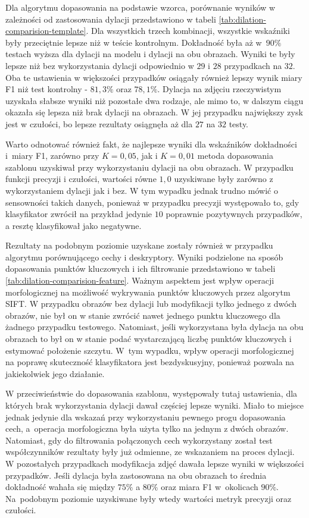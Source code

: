 Dla algorytmu dopasowania na podstawie wzorca, porównanie wyników w zależności od zastosowania dylacji przedstawiono w tabeli \ref{tab:dilation-comparision-template}. Dla wszystkich trzech kombinacji, wszystkie wskaźniki były przeciętnie lepsze niż w teście kontrolnym. Dokładność była aż w~$90\%$ testach wyższa dla dylacji na modelu i dylacji na obu obrazach. Wyniki te były lepsze niż bez wykorzystania dylacji odpowiednio w $29$ i $28$ przypadkach na $32$. Oba te ustawienia w większości przypadków osiągały również lepszy wynik miary F1 niż test kontrolny - $81,3\%$ oraz $78,1\%$. Dylacja na zdjęciu rzeczywistym uzyskała słabsze wyniki niż pozostałe dwa rodzaje, ale mimo to, w dalszym ciągu okazała się lepsza niż brak dylacji na obrazach. W jej przypadku największy zysk jest w czułości, bo lepsze rezultaty osiągnęła aż dla $27$ na $32$ testy. 

Warto odnotować również fakt, że najlepsze wyniki dla wskaźników dokładności i~miary F1, zarówno przy $K=0,05$, jak i $K=0,01$ metoda dopasowania szablonu uzyskiwał przy wykorzystaniu dylacji na obu obrazach. W przypadku funkcji precyzji i czułości, wartości równe $1,0$ uzyskiwane były zarówno z wykorzystaniem dylacji jak i bez. W tym wypadku jednak trudno mówić o sensowności takich danych, ponieważ w przypadku precyzji występowało to, gdy klasyfikator zwrócił na przykład jedynie $10$ poprawnie pozytywnych przypadków, a resztę klasyfikował jako negatywne. 



Rezultaty na podobnym poziomie uzyskane zostały również w przypadku algorytmu porównującego cechy i deskryptory. Wyniki podzielone na sposób dopasowania punktów kluczowych i ich filtrowanie przedstawiono w tabeli \ref{tab:dilation-comparision-feature}. Ważnym aspektem jest wpływ operacji morfologicznej na możliwość wykrywania punktów kluczowych przez algorytm SIFT. W przypadku obrazów bez dylacji lub modyfikacji tylko jednego z dwóch obrazów, nie był on w stanie zwrócić nawet jednego punktu kluczowego dla żadnego przypadku testowego. Natomiast, jeśli wykorzystana była dylacja na obu obrazach to był on w stanie podać wystarczającą liczbę punktów kluczowych i estymować położenie szczytu. W~tym wypadku, wpływ operacji morfologicznej na poprawę skuteczność klasyfikatora jest bezdyskusyjny, ponieważ pozwala na jakiekolwiek jego działanie. 

W przeciwieństwie do dopasowania szablonu, występowały tutaj ustawienia, dla których brak wykorzystania dylacji dawał częściej lepsze wyniki. Miało to miejsce jednak jedynie dla wskazań przy wykorzystaniu pewnego progu dopasowania cech, a~operacja morfologiczna była użyta tylko na jednym z dwóch obrazów. Natomiast, gdy do filtrowania połączonych cech wykorzystany został test współczynników rezultaty były już odmienne, ze wskazaniem na proces dylacji. W pozostałych przypadkach modyfikacja zdjęć dawała lepsze wyniki w większości przypadków. Jeśli dylacja była zastosowana na obu obrazach to średnia dokładność wahała się między $75\%$ a $80\%$ oraz miara F1 w~okolicach $90\%$. Na~podobnym poziomie uzyskiwane były wtedy wartości metryk precyzji oraz czułości. 



